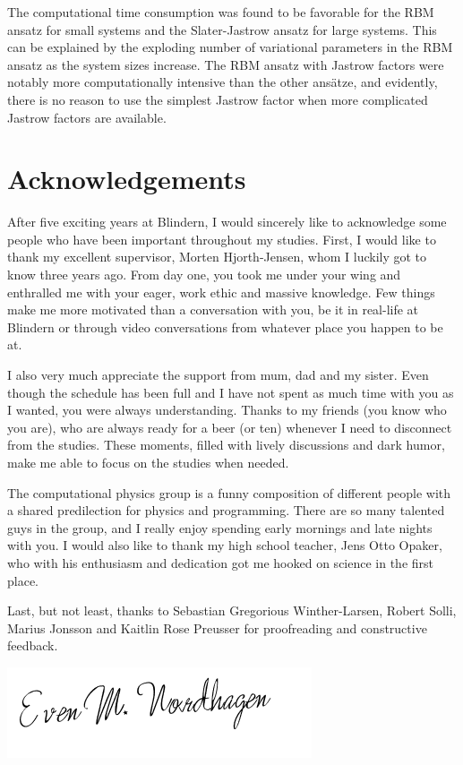 The computational time consumption was found to be favorable for the RBM ansatz for small systems and the Slater-Jastrow ansatz for large systems. This can be explained by the exploding number of variational parameters in the RBM ansatz as the system sizes increase. The RBM ansatz with Jastrow factors were notably more computationally intensive than the other ansätze, and evidently, there is no reason to use the simplest Jastrow factor when more complicated Jastrow factors are available.

\thispagestyle{empty}
\cleardoublepage

\section*{Acknowledgements}
After five exciting years at Blindern, I would sincerely like to acknowledge some people who have been important throughout my studies. First, I would like to thank my excellent supervisor, Morten Hjorth-Jensen, whom I luckily got to know three years ago. From day one, you took me under your wing and enthralled me with your eager, work ethic and massive knowledge. Few things make me more motivated than a conversation with you, be it in real-life at Blindern or through video conversations from whatever place you happen to be at.

I also very much appreciate the support from mum, dad and my sister. Even though the schedule has been full and I have not spent as much time with you as I wanted, you were always understanding. Thanks to my friends (you know who you are), who are always ready for a beer (or ten) whenever I need to disconnect from the studies. These moments, filled with lively discussions and dark humor, make me able to focus on the studies when needed.

The computational physics group is a funny composition of different people with a shared predilection for physics and programming. There are so many talented guys in the group, and I really enjoy spending early mornings and late nights with you. I would also like to thank my high school teacher, Jens Otto Opaker, who with his enthusiasm and dedication got me hooked on science in the first place.

Last, but not least, thanks to Sebastian Gregorious Winther-Larsen, Robert Solli, Marius Jonsson and Kaitlin Rose Preusser for proofreading and constructive feedback.\vspace{3cm}

\includegraphics[scale=0.7]{../Images/signature.png}

